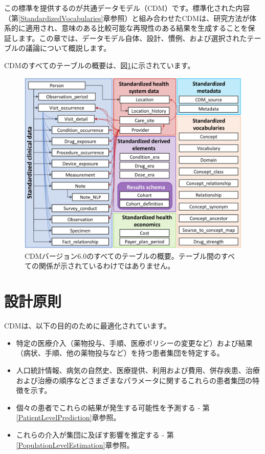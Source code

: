 \documentclass[
  11pt]{book}
\providecommand{\tightlist}{%
  \setlength{\itemsep}{0pt}\setlength{\parskip}{0pt}}
\theoremstyle{definition}
\theoremstyle{definition}
\theoremstyle{definition}
\theoremstyle{definition}
\theoremstyle{remark}
\begin{document}
この標準を提供するのが共通データモデル（CDM）です。標準化された内容（第\ref{StandardizedVocabularies}章参照）と組み合わせたCDMは、研究方法が体系的に適用され、意味のある比較可能な再現性のある結果を生成することを保証します。この章では、データモデル自体、設計、慣例、および選択されたテーブルの議論について概説します。

CDMのすべてのテーブルの概要は、図\ref{fig:cdmDiagram}に示されています。 

\begin{figure}
\includegraphics[width=1\linewidth]{images/CommonDataModel/cdmDiagram} \caption{CDMバージョン6.0のすべてのテーブルの概要。テーブル間のすべての関係が示されているわけではありません。}\label{fig:cdmDiagram}
\end{figure}

\section{設計原則}\label{ux8a2dux8a08ux539fux5247}

CDMは、以下の目的のために最適化されています。 

\begin{itemize}
\tightlist
\item
  特定の医療介入（薬物投与、手順、医療ポリシーの変更など）および結果（病状、手順、他の薬物投与など）を持つ患者集団を特定する。
\item
  人口統計情報、病気の自然史、医療提供、利用および費用、併存疾患、治療および治療の順序などさまざまなパラメータに関するこれらの患者集団の特徴を示す。
\item
  個々の患者でこれらの結果が発生する可能性を予測する - 第\ref{PatientLevelPrediction}章参照。
\item
  これらの介入が集団に及ぼす影響を推定する - 第\ref{PopulationLevelEstimation}章参照。
\end{itemize}
\end{document}
